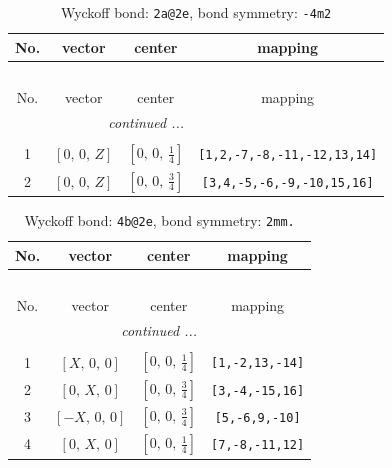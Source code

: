 \documentclass[fleqn,8pt]{jsarticle}
\begin{document}
\begin{longtable}{cccc}
\caption{Wyckoff bond: {\tt 2a@2e}, bond symmetry: {\tt -4m2}}
 \\
 \hline \hline
No. & vector & center & mapping \\ \hline \endfirsthead

\multicolumn{3}{l}{\tablename\ \thetable{}} \\
 \hline \hline
No. & vector & center & mapping \\ \hline \endhead

 \hline \hline
\multicolumn{3}{r}{\footnotesize\it continued ...} \\ \endfoot

 \hline \hline
\multicolumn{3}{r}{} \\ \endlastfoot

1 & $\left[ 0,\, 0,\, Z \right]$ & $\left[ 0,\, 0,\, \frac{1}{4} \right]$ & {\tt [1,2,-7,-8,-11,-12,13,14]} \\ \hline
2 & $\left[ 0,\, 0,\, Z \right]$ & $\left[ 0,\, 0,\, \frac{3}{4} \right]$ & {\tt [3,4,-5,-6,-9,-10,15,16]} \\
\end{longtable}
\renewcommand{\arraystretch}{1.2}
\begin{longtable}{cccc}
\caption{Wyckoff bond: {\tt 4b@2e}, bond symmetry: {\tt 2mm.}}
 \\
 \hline \hline
No. & vector & center & mapping \\ \hline \endfirsthead

\multicolumn{3}{l}{\tablename\ \thetable{}} \\
 \hline \hline
No. & vector & center & mapping \\ \hline \endhead

 \hline \hline
\multicolumn{3}{r}{\footnotesize\it continued ...} \\ \endfoot

 \hline \hline
\multicolumn{3}{r}{} \\ \endlastfoot

1 & $\left[ X,\, 0,\, 0 \right]$ & $\left[ 0,\, 0,\, \frac{1}{4} \right]$ & {\tt [1,-2,13,-14]} \\ \hline
2 & $\left[ 0,\, X,\, 0 \right]$ & $\left[ 0,\, 0,\, \frac{3}{4} \right]$ & {\tt [3,-4,-15,16]} \\ \hline
3 & $\left[ - X,\, 0,\, 0 \right]$ & $\left[ 0,\, 0,\, \frac{3}{4} \right]$ & {\tt [5,-6,9,-10]} \\ \hline
4 & $\left[ 0,\, X,\, 0 \right]$ & $\left[ 0,\, 0,\, \frac{1}{4} \right]$ & {\tt [7,-8,-11,12]} \\
\end{longtable}
\end{document}
